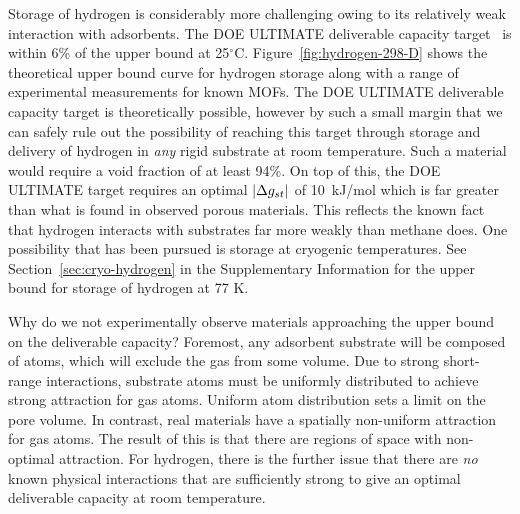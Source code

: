 Storage of hydrogen is considerably more challenging owing to its relatively weak interaction with adsorbents. The DOE ULTIMATE deliverable capacity target~\cite{DOE} is within 6\% of the upper bound at 25$^\circ$C. Figure~\ref{fig:hydrogen-298-D} shows the theoretical upper bound curve for hydrogen storage along with a range of experimental measurements for known MOFs.  The DOE ULTIMATE deliverable capacity target is theoretically possible, however by such a small margin that we can safely rule out the possibility of reaching this target through storage and delivery of hydrogen in \emph{any} rigid substrate at room temperature. Such a material would require a void fraction of at least 94\%. On top of this, the DOE ULTIMATE target requires an optimal $|\Delta g_{st}|$ of 10~kJ/mol which is far greater than what is found in observed porous materials. This reflects the known fact that hydrogen interacts with substrates far more weakly than methane does. One possibility that has been pursued is storage at cryogenic temperatures. See Section~\ref{sec:cryo-hydrogen} in the Supplementary Information for the upper bound for storage of hydrogen at 77 K.

Why do we not experimentally observe materials approaching the upper bound on the deliverable capacity? Foremost, any adsorbent substrate will be composed of atoms, which will exclude the gas from some volume. Due to strong short-range interactions, substrate atoms must be uniformly distributed to achieve strong attraction for gas atoms. Uniform atom distribution sets a limit on the pore volume.
In contrast, real materials have a spatially non-uniform attraction for gas atoms. The result of this is that there are regions of space with non-optimal attraction. For hydrogen, there is the further issue that there are \emph{no} known physical interactions that are sufficiently strong to give an optimal deliverable capacity at room temperature.

